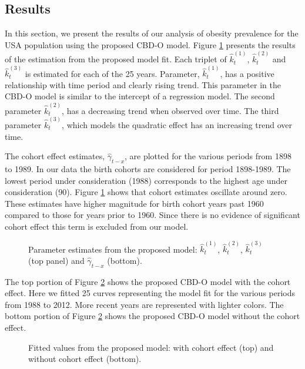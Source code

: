 \documentclass[11pt,letterpaper]{article}
\numberwithin{equation}{section}
\begin{document}
\subsection{Results}

In this section, we present the results of our analysis of obesity prevalence for the USA population using the proposed CBD-O model. Figure \ref{fig:plot2} presents the results of the estimation from the proposed model fit. Each triplet of $\hat k_t^{(1)}$, $\hat k_t^{(2)}$ and $\hat k_t^{(3)}$ is estimated for each of the 25 years. Parameter, $\hat k_t^{(1)}$, has a positive relationship with time period and clearly rising trend. This parameter in the CBD-O model is similar to the intercept of a regression model.  The second parameter $\hat k_t^{(2)}$, has a decreasing trend when observed over time. The third parameter $\hat k_t^{(3)}$, which models the quadratic effect has an increasing trend over time.

The cohort effect estimates, $\hat \gamma_{t-x}$, are plotted for the various periods from 1898 to 1989. In our data the birth cohorts are considered for period 1898-1989. The lowest period under consideration (1988) corresponds to the highest age under consideration (90). Figure \ref{fig:plot2} shows that cohort estimates oscillate around zero.  These estimates have higher magnitude for birth cohort years past 1960 compared to those for years prior to 1960. Since there is no evidence of significant cohort effect this term is excluded from our model.

\begin{figure}
\begin{center}
{}
{}
\caption{\label{fig:plot2}Parameter estimates from the proposed model: $\hat k_t^{(1)}$, $\hat k_t^{(2)}$, $\hat k_t^{(3)}$ (top panel) and $\hat \gamma_{t-x}$ (bottom).}
\end{center}
\end{figure}

The top portion of Figure \ref{fig:f5} shows the proposed CBD-O model with the cohort effect. Here we fitted 25 curves representing the model fit for the various periods from 1988 to 2012. More recent years are represented with lighter colors. The bottom portion of Figure \ref{fig:f5} shows the proposed CBD-O model without the cohort effect.

\begin{figure}
\begin{center}
{}
{}
\caption{\label{fig:f5} Fitted values from the proposed model: with cohort effect (top) and without cohort effect (bottom).}
\end{center}
\end{figure}
\end{document}
